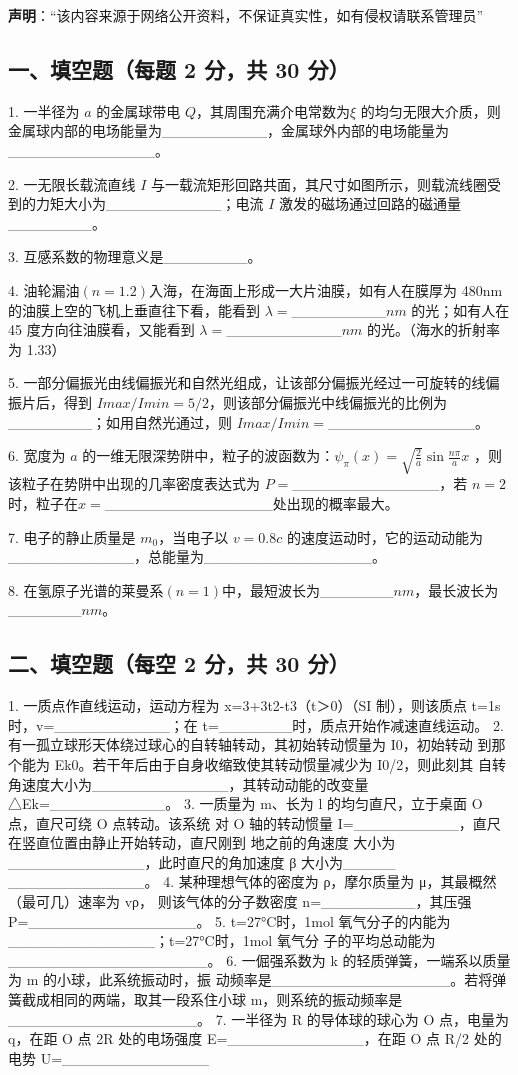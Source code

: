
\textbf{声明}：“该内容来源于网络公开资料，不保证真实性，如有侵权请联系管理员”

\subsection{一、填空题（每题 2 分，共 30 分）}
1. 一半径为 $a$ 的金属球带电 $Q$，其周围充满介电常数为$\xi$ 的均匀无限大介质，则金属球内部的电场能量为__________，金属球外内部的电场能量为______________。

2. 一无限长载流直线 $I$ 与一载流矩形回路共面，其尺寸如图所示，则载流线圈受到的力矩大小为___________；电流 $I$ 激发的磁场通过回路的磁通量________。

3. 互感系数的物理意义是________。

4. 油轮漏油$(n=1.2)$入海，在海面上形成一大片油膜，如有人在膜厚为 480nm的油膜上空的飞机上垂直往下看，能看到 $\lambda=$_________$nm$ 的光；如有人在 45 度方向往油膜看，又能看到 $\lambda=$___________$nm$ 的光。（海水的折射率为 1.33）

5. 一部分偏振光由线偏振光和自然光组成，让该部分偏振光经过一可旋转的线偏振片后，得到 $Imax/Imin=5/2$，则该部分偏振光中线偏振光的比例为________；如用自然光通过，则 $Imax/Imin=$______________。

6. 宽度为 $a$ 的一维无限深势阱中，粒子的波函数为：$\psi_\pi(x)=\sqrt{\frac{2}{a}}\sin\frac{n \pi}{a}x$ ，则该粒子在势阱中出现的几率密度表达式为 $P=$______________，若 $n=2$ 时，粒子在$x=$________________处出现的概率最大。

7. 电子的静止质量是 $m_0$，当电子以 $v=0.8c$ 的速度运动时，它的运动动能为____________，总能量为________________。

8. 在氢原子光谱的莱曼系$(n=1)$中，最短波长为_______$nm$，最长波长为_______$nm$。
\subsection{二、填空题（每空 2 分，共 30 分）}
1. 一质点作直线运动，运动方程为 x=3+3t2-t3（t＞0）（SI 制），则该质点 t=1s
时，v=___________；在 t=_______时，质点开始作减速直线运动。
2. 有一孤立球形天体绕过球心的自转轴转动，其初始转动惯量为 I0，初始转动
到那个能为 Ek0。若干年后由于自身收缩致使其转动惯量减少为 I0/2，则此刻其
自转角速度大小为_____________，其转动动能的改变量△Ek=___________。
3. 一质量为 m、长为 l 的均匀直尺，立于桌面 O 点，直尺可绕 O 点转动。该系统
对 O 轴的转动惯量 I=__________，直尺在竖直位置由静止开始转动，直尺刚到
地之前的角速度 大小为_____________，此时直尺的角加速度 β 大小为_____
_____________。
4. 某种理想气体的密度为 ρ，摩尔质量为 μ，其最概然（最可几）速率为 vρ，
则该气体的分子数密度 n=_________，其压强 P=________________。
5. t=27°C时，1mol 氧气分子的内能为______________；t=27°C时，1mol 氧气分
子的平均总动能为___________________。
6. 一倔强系数为 k 的轻质弹簧，一端系以质量为 m 的小球，此系统振动时，振
动频率是_________________。若将弹簧截成相同的两端，取其一段系住小球
m，则系统的振动频率是__________________。
7. 一半径为 R 的导体球的球心为 O 点，电量为 q，在距 O 点 2R 处的电场强度
E=_____________，在距 O 点 R/2 处的电势 U=______________